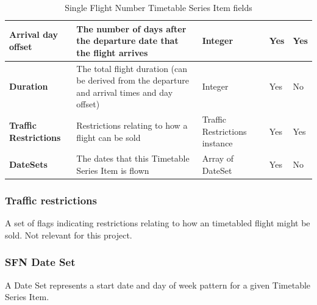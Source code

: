 \begin{table}[H]
\begin{tabular}{|>{\raggedright\arraybackslash}p{2.5cm}|>{\raggedright\arraybackslash}p{4cm}|>{\raggedright\arraybackslash}p{2.5cm}|>{\raggedright\arraybackslash}p{2cm}|>{\raggedright\arraybackslash}p{1.2cm}|}
\textbf{Arrival day offset}              & The number of days after the departure date that the flight arrives                            & Integer                       & Yes               & Yes          \\ \hline
\textbf{Duration}                        & The total flight duration (can be derived from the departure and arrival times and day offset) & Integer                       & Yes               & No           \\ \hline
\textbf{Traffic Restrictions}            & Restrictions relating to how a flight can be sold                                              & Traffic Restrictions instance & Yes               & Yes          \\ \hline
\textbf{DateSets}                        & The dates that this Timetable Series Item is flown                                             & Array of DateSet              & Yes               & No           \\ \hline
\end{tabular}
\caption{Single Flight Number Timetable Series Item fields}
\label{sfn-series-item}
\end{table}

\subsubsection*{Traffic restrictions}

A set of flags indicating restrictions relating to how an timetabled flight might be sold. Not relevant for this project.

\subsubsection*{SFN Date Set} \label{sfn-date-set}

A Date Set represents a start date and day of week pattern for a given Timetable Series Item.


